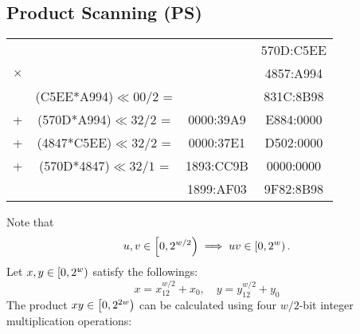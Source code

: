 \subsection{Product Scanning (PS)}
\begin{table}[h!]\centering\renewcommand{\arraystretch}{1.25}
{\ttfamily\footnotesize\begin{tabular*}{\textwidth}{@{\extracolsep{\fill}}cccc}
&&& 570D:C5EE\\
$\times$ &&& 4857:A994\\ 
\cline{1-4}
& (C5EE*A994)$\ll 00/2$ = &   & 831C:8B98 \\
+&(570D*A994)$\ll 32/2$ = &   0000:39A9 & E884:0000 \\
+&(4847*C5EE)$\ll 32/2$ = &   0000:37E1 & D502:0000 \\
+&(570D*4847)$\ll 32/1$ = &   1893:CC9B & 0000:0000 \\
\cline{1-4}
& & 1899:AF03 & 9F82:8B98
\end{tabular*}}
\end{table}
\noindent Note that \[
u,v\in\intco{0,2^{w/2}}\implies uv\in\intco{0,2^w}.
\]
Let $x,y\in\intco{0, 2^w}$ satisfy the followings: \[
x = x_12^{w/2}+x_0,\quad
y = y_12^{w/2}+y_0
\]
The product $xy\in\intco{0,2^{2w}}$ can be calculated using four $w/2$-bit integer multiplication operations:
